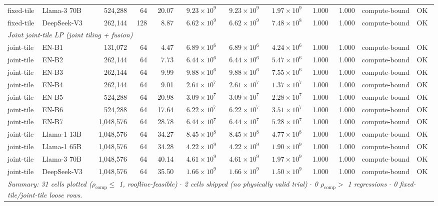 \begin{table}[ht!]
{\begin{tabular}{llrrrrrrrrll}
fixed-tile & Llama-3 70B & 524{,}288 & 64  & 20.07 & $9.23\times10^{9}$ & $9.23\times10^{9}$ & $1.97\times10^{9}$ & 1.000 & 1.000 & compute-bound & OK \\
fixed-tile & DeepSeek-V3 & 262{,}144 & 128 &  8.87 & $6.62\times10^{9}$ & $6.62\times10^{9}$ & $7.48\times10^{8}$ & 1.000 & 1.000 & compute-bound & OK \\
\midrule
\multicolumn{12}{l}{\textit{Joint joint-tile LP (joint tiling + fusion)}} \\
\midrule
joint-tile & EN-B1       &    131{,}072 & 64 &  4.47 & $6.89\times10^{6}$ & $6.89\times10^{6}$ & $4.24\times10^{6}$ & 1.000 & 1.000 & compute-bound & OK \\
joint-tile & EN-B2       &    262{,}144 & 64 &  7.73 & $6.44\times10^{6}$ & $6.44\times10^{6}$ & $5.47\times10^{6}$ & 1.000 & 1.000 & compute-bound & OK \\
joint-tile & EN-B3       &    262{,}144 & 64 &  9.99 & $9.88\times10^{6}$ & $9.88\times10^{6}$ & $7.55\times10^{6}$ & 1.000 & 1.000 & compute-bound & OK \\
joint-tile & EN-B4       &    262{,}144 & 64 &  9.01 & $2.61\times10^{7}$ & $2.61\times10^{7}$ & $1.37\times10^{7}$ & 1.000 & 1.000 & compute-bound & OK \\
joint-tile & EN-B5       &    524{,}288 & 64 & 20.98 & $3.09\times10^{7}$ & $3.09\times10^{7}$ & $2.28\times10^{7}$ & 1.000 & 1.000 & compute-bound & OK \\
joint-tile & EN-B6       &    524{,}288 & 64 & 17.64 & $6.22\times10^{7}$ & $6.22\times10^{7}$ & $3.51\times10^{7}$ & 1.000 & 1.000 & compute-bound & OK \\
joint-tile & EN-B7       & 1{,}048{,}576 & 64 & 28.78 & $6.44\times10^{7}$ & $6.44\times10^{7}$ & $5.28\times10^{7}$ & 1.000 & 1.000 & compute-bound & OK \\
joint-tile & Llama-1 13B & 1{,}048{,}576 & 64 & 34.27 & $8.45\times10^{8}$ & $8.45\times10^{8}$ & $4.77\times10^{8}$ & 1.000 & 1.000 & compute-bound & OK \\
joint-tile & Llama-1 65B & 1{,}048{,}576 & 64 & 34.28 & $4.22\times10^{9}$ & $4.22\times10^{9}$ & $1.90\times10^{9}$ & 1.000 & 1.000 & compute-bound & OK \\
joint-tile & Llama-3 70B & 1{,}048{,}576 & 64 & 40.14 & $4.61\times10^{9}$ & $4.61\times10^{9}$ & $1.97\times10^{9}$ & 1.000 & 1.000 & compute-bound & OK \\
joint-tile & DeepSeek-V3 & 1{,}048{,}576 & 64 & 35.50 & $1.66\times10^{9}$ & $1.66\times10^{9}$ & $1.50\times10^{9}$ & 1.000 & 1.000 & compute-bound & OK \\
\midrule
\multicolumn{12}{l}{%
\textit{Summary: 31 cells plotted ($\rho_{\mathrm{comp}} \leq$ 1, roofline-feasible) $\cdot$
2 cells skipped (no physically valid trial) $\cdot$
0 $\rho_{\mathrm{comp}} >$ 1 regressions $\cdot$
0 fixed-tile/joint-tile loose rows.}}\\
\bottomrule
\end{tabular}%
}
\end{table}


